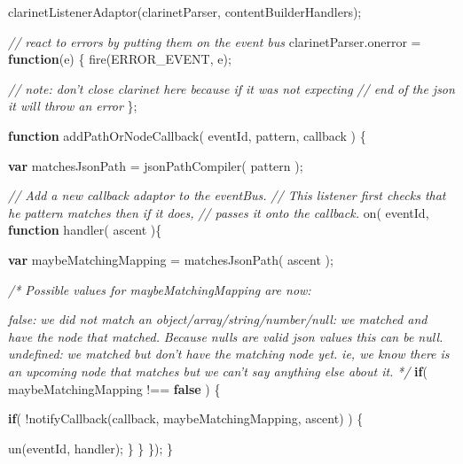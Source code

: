 \documentclass[]{article}
\newenvironment{Shaded}{}{}
\newcommand{\KeywordTok}[1]{\textcolor[rgb]{0.00,0.44,0.13}{\textbf{{#1}}}}
\newcommand{\CommentTok}[1]{\textcolor[rgb]{0.38,0.63,0.69}{\textit{{#1}}}}
\newcommand{\OtherTok}[1]{\textcolor[rgb]{0.00,0.44,0.13}{{#1}}}
\newcommand{\FunctionTok}[1]{\textcolor[rgb]{0.02,0.16,0.49}{{#1}}}
\newcommand{\NormalTok}[1]{{#1}}
\begin{document}
\begin{Shaded}
\begin{Highlighting}[]
   \FunctionTok{clarinetListenerAdaptor}\NormalTok{(clarinetParser, contentBuilderHandlers);}
  
   \CommentTok{// react to errors by putting them on the event bus}
   \OtherTok{clarinetParser}\NormalTok{.}\FunctionTok{onerror} \NormalTok{= }\KeywordTok{function}\NormalTok{(e) \{          }
      \FunctionTok{fire}\NormalTok{(ERROR_EVENT, e);}
      
      \CommentTok{// note: don't close clarinet here because if it was not expecting}
      \CommentTok{// end of the json it will throw an error}
   \NormalTok{\};}

   \KeywordTok{function} \FunctionTok{addPathOrNodeCallback}\NormalTok{( eventId, pattern, callback ) \{}
   
      \KeywordTok{var} \NormalTok{matchesJsonPath = }\FunctionTok{jsonPathCompiler}\NormalTok{( pattern );}
   
      \CommentTok{// Add a new callback adaptor to the eventBus.}
      \CommentTok{// This listener first checks that he pattern matches then if it does, }
      \CommentTok{// passes it onto the callback. }
      \FunctionTok{on}\NormalTok{( eventId, }\KeywordTok{function} \FunctionTok{handler}\NormalTok{( ascent )\{ }
 
         \KeywordTok{var} \NormalTok{maybeMatchingMapping = }\FunctionTok{matchesJsonPath}\NormalTok{( ascent );}
     
         \CommentTok{/* Possible values for maybeMatchingMapping are now:}

\CommentTok{            false: }
\CommentTok{               we did not match }
\CommentTok{  }
\CommentTok{            an object/array/string/number/null: }
\CommentTok{               we matched and have the node that matched.}
\CommentTok{               Because nulls are valid json values this can be null.}
\CommentTok{  }
\CommentTok{            undefined: }
\CommentTok{               we matched but don't have the matching node yet.}
\CommentTok{               ie, we know there is an upcoming node that matches but we }
\CommentTok{               can't say anything else about it. }
\CommentTok{         */}
         \KeywordTok{if}\NormalTok{( maybeMatchingMapping !== }\KeywordTok{false} \NormalTok{) \{                                 }

            \KeywordTok{if}\NormalTok{( !}\FunctionTok{notifyCallback}\NormalTok{(callback, maybeMatchingMapping, ascent) ) \{}
            
               \FunctionTok{un}\NormalTok{(eventId, handler);}
            \NormalTok{\}}
         \NormalTok{\}}
      \NormalTok{\});   }
   \NormalTok{\}   }
   

\end{Highlighting}
\end{Shaded}
\end{document}
